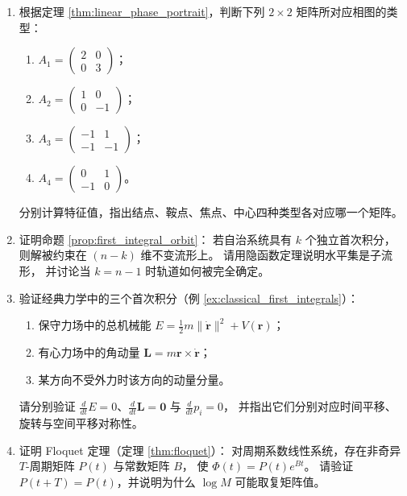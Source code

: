 \begin{enumerate}[leftmargin=3em, label=\textbf{题 \arabic*}]
    \item 根据定理 \ref{thm:linear_phase_portrait}，判断下列 $2\times2$ 矩阵所对应相图的类型：
    \begin{enumerate}[label=(\roman*)]
        \item $A_1=\begin{pmatrix}2&0\\0&3\end{pmatrix}$；
        \item $A_2=\begin{pmatrix}1&0\\0&-1\end{pmatrix}$；
        \item $A_3=\begin{pmatrix}-1&1\\-1&-1\end{pmatrix}$；
        \item $A_4=\begin{pmatrix}0&1\\-1&0\end{pmatrix}$。
    \end{enumerate}
    分别计算特征值，指出结点、鞍点、焦点、中心四种类型各对应哪一个矩阵。

    \item 证明命题 \ref{prop:first_integral_orbit}：
    若自治系统具有 $k$ 个独立首次积分，则解被约束在 $(n-k)$ 维不变流形上。
    请用隐函数定理说明水平集是子流形，
    并讨论当 $k=n-1$ 时轨道如何被完全确定。

    \item 验证经典力学中的三个首次积分（例 \ref{ex:classical_first_integrals}）：
    \begin{enumerate}[label=(\roman*)]
        \item 保守力场中的总机械能 $E=\frac12m\|\dot{\mathbf{r}}\|^2+V(\mathbf{r})$；
        \item 有心力场中的角动量 $\mathbf{L}=m\mathbf{r}\times\dot{\mathbf{r}}$；
        \item 某方向不受外力时该方向的动量分量。
    \end{enumerate}
    请分别验证 $\frac{d}{dt}E=0$、$\frac{d}{dt}\mathbf{L}=\mathbf{0}$ 与 $\frac{d}{dt}p_i=0$，
    并指出它们分别对应时间平移、旋转与空间平移对称性。

    \item 证明 Floquet 定理（定理 \ref{thm:floquet}）：
    对周期系数线性系统，存在非奇异 $T$-周期矩阵 $P(t)$ 与常数矩阵 $B$，
    使 $\Phi(t)=P(t)e^{Bt}$。
    请验证 $P(t+T)=P(t)$，并说明为什么 $\log M$ 可能取复矩阵值。


\end{enumerate}
